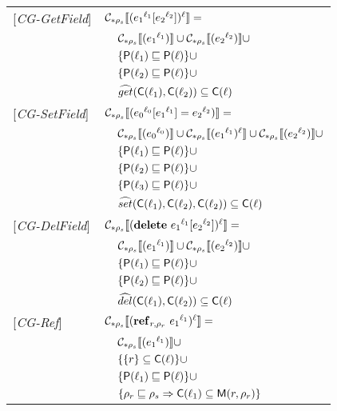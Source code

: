 \documentclass[[12pt,a4paper,twoside,openrigh]{article}
\newcommand{\lbt}[1]{{e_#1}^{\ell_#1}}
\begin{document}
\newpage
\begin{tabular} {l l l l}
{[\textit{CG-GetField}]}&\multicolumn{3}{l}{$\genl {\lookup {\lbt 1} {\lbt 2}} = $}\\
&&\multicolumn{2}{l}{$ \gen {\lbt1} \cup \gen {\lbt 2} \cup$}\\
&&\multicolumn{2}{l}{$\{ \mathsf{P}(\ell_1) \sqsubseteq \mathsf{P}(\ell) \} \cup$} \\
&&\multicolumn{2}{l}{$\{ \mathsf{P}(\ell_2) \sqsubseteq \mathsf{P}(\ell) \} \cup$} \\
&&\multicolumn{2}{l}{$\widehat{get} (\mathsf{C}(\ell_1), \mathsf{C}(\ell_2)) \subseteq \mathsf{C}(\ell)$} \\
{[\textit{CG-SetField}]}&\multicolumn{3}{l}{$\gen {\store {\lbt 0} {\lbt 1} {\lbt 2}} = $}\\
&&\multicolumn{2}{l}{$ \gen {\lbt 0} \cup \genl {\lbt 1} \cup \gen {\lbt 2} \cup $}\\
&&\multicolumn{2}{l}{$\{ \mathsf{P}(\ell_1) \sqsubseteq \mathsf{P}(\ell) \} \cup$} \\
&&\multicolumn{2}{l}{$\{ \mathsf{P}(\ell_2) \sqsubseteq \mathsf{P}(\ell) \} \cup$} \\
&&\multicolumn{2}{l}{$\{ \mathsf{P}(\ell_3) \sqsubseteq \mathsf{P}(\ell) \} \cup$} \\
&&\multicolumn{2}{l}{$\widehat{set} (\mathsf{C}(\ell_1), \mathsf{C}(\ell_2), \mathsf{C}(\ell_2)) \subseteq \mathsf{C}(\ell)$} \\
{[\textit{CG-DelField}]}&\multicolumn{3}{l}{$\genl {\delete {\lbt 1} {\lbt 2}} = $}\\ 
&&\multicolumn{2}{l}{$ \gen {\lbt1} \cup \gen {\lbt 2} \cup$}\\
&&\multicolumn{2}{l}{$\{ \mathsf{P}(\ell_1) \sqsubseteq \mathsf{P}(\ell) \} \cup$} \\
&&\multicolumn{2}{l}{$\{ \mathsf{P}(\ell_2) \sqsubseteq \mathsf{P}(\ell) \} \cup$} \\
&&\multicolumn{2}{l}{$\widehat{del} (\mathsf{C}(\ell_1), \mathsf{C}(\ell_2)) \subseteq \mathsf{C}(\ell)$}\\
{[\textit{CG-Ref}]}&\multicolumn{3}{l}{$ \genl {\newref {r,\rho_r} {\lbt 1}} = $}\\
&&\multicolumn{2}{l}{$\gen {\lbt 1} \cup $}\\
&&\multicolumn{2}{l}{$\{ \{r\} \subseteq \mathsf{C}(\ell) \} \cup$}\\
&&\multicolumn{2}{l}{$\{ \mathsf{P}(\ell_1) \sqsubseteq \mathsf{P}(\ell) \} \cup$}\\
&&\multicolumn{2}{l}{$\{ \rho_r \sqsubseteq \rho_s \Rightarrow \mathsf{C}(\ell_1) \subseteq \mathsf{M}(r, \rho_r) \} $}\\

\end{tabular}
\end{document}
